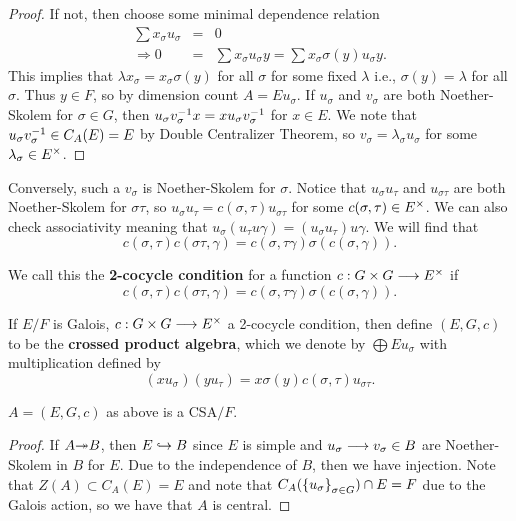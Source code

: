 \begin{proof}
If not, then choose some minimal dependence relation
\begin{eqnarray*}
\sum x_{\sigma}u_{\sigma} &=& 0 \\
\Rightarrow 0 & = & \sum x_{\sigma}u_{\sigma}y = \sum x_{\sigma}\sigma(y) u_{\sigma}y.
\end{eqnarray*}
This implies that $\lambda x_{\sigma} = x_{\sigma} \sigma (y)$ for all $\sigma$ for some fixed $\lambda$ i.e., $\sigma (y) = \lambda$ for all $\sigma$. Thus $y\in F$, so by dimension count $A = Eu_{\sigma}.$  If $u_{\sigma}$ and $v_{\sigma}$ are both Noether-Skolem for $\sigma \in G$, then $u_{\sigma}v_{\sigma}^{-1} x = x u_{\sigma}v_{\sigma}^{-1}$ for $x \in E$. We note that $u_{\sigma}v_{\sigma}^{-1} \in C_A(E) = E$ by Double Centralizer Theorem, so $v_{\sigma} = \lambda_{\sigma}u_{\sigma}$ for some $\lambda_{\sigma} \in E^{\times}$.
\end{proof}
Conversely, such a $v_{\sigma}$ is Noether-Skolem for $\sigma$. Notice that $u_{\sigma}u_{\tau}$ and $u_{\sigma\tau}$ are both Noether-Skolem for $\sigma \tau$, so $u_{\sigma}u_{\tau} = c(\sigma , \tau)u_{\sigma\tau}$ for some $c(\sigma , \tau) \in E^{\times}$. We can also check associativity meaning that $u_{\sigma}(u_{\tau}u{\gamma}) = (u_{\sigma}u_{\tau})u{\gamma}.$ 
We will find that 
\begin{equation}
c(\sigma,\tau)c(\sigma\tau , \gamma) = c(\sigma,\tau\gamma)\sigma(c(\sigma,\gamma)).
\end{equation}
\begin{defn}\label{4.4}
We call this the \textbf{2-cocycle condition} for a function $c : G \times G \longrightarrow E^{\times}$ if 
$$c(\sigma,\tau)c(\sigma\tau , \gamma) = c(\sigma,\tau\gamma)\sigma(c(\sigma,\gamma)).$$
\end{defn}
\begin{defn}\label{4.5}
If $E/F$ is Galois, $c : G \times G \longrightarrow E^{\times}$ a 2-cocycle condition, then define $(E,G,c)$ to be the \textbf{crossed product algebra}, which we denote by $\bigoplus Eu_{\sigma}$ with multiplication defined by 
$$(xu_{\sigma})(yu_{\tau}) = x\sigma (y)c(\sigma , \tau)u_{\sigma\tau}.$$
\end{defn}
\begin{prop}\label{4.6}
$A = (E,G,c)$ as above is a CSA$/F$.
\end{prop}

\begin{proof}
If $A \surj B$, then $E \hookrightarrow B$ since $E$ is simple and $u_{\sigma} \longrightarrow v_{\sigma} \in B$ are Noether-Skolem in $B$ for $E$. Due to the independence of $B$, then we have injection. Note that $Z(A) \subset C_A(E) = E$ and note that $C_A(\left\lbrace u_{\sigma} \right\rbrace_{\sigma \in G}) \cap E = F$ due to the Galois action, so we have that $A$ is central.
\end{proof}

